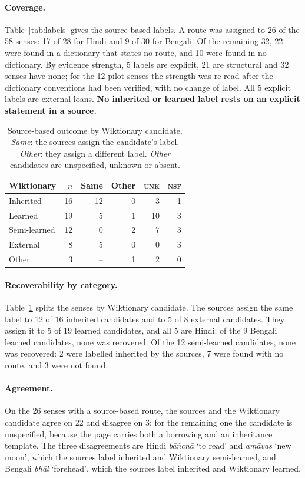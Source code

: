 \documentclass[11pt]{article}
\newcommand{\lbl}[1]{\textsc{#1}}
\newcommand{\gl}[1]{`#1'}
\begin{document}
\paragraph{Coverage.} Table~\ref{tab:labels} gives the source-based labels. A route was assigned to 26 of the 58 senses: 17 of 28 for Hindi and 9 of 30 for Bengali. Of the remaining 32, 22 were found in a dictionary that states no route, and 10 were found in no dictionary. By evidence strength, 5 labels are explicit, 21 are structural and 32 senses have none; for the 12 pilot senses the strength was re-read after the dictionary conventions had been verified, with no change of label. All 5 explicit labels are external loans. \textbf{No inherited or learned label rests on an explicit statement in a source.}

\begin{table}[h]
\centering\small
\begin{tabular}{lrrrrr}
\toprule
\textbf{Wiktionary} & \textbf{$n$} & \textbf{Same} & \textbf{Other} & \textbf{\lbl{unk}} & \textbf{\lbl{nsf}} \\
\midrule
Inherited & 16 & 12 & 0 & 3 & 1 \\
Learned & 19 & 5 & 1 & 10 & 3 \\
Semi-learned & 12 & 0 & 2 & 7 & 3 \\
External & 8 & 5 & 0 & 0 & 3 \\
Other & 3 & -- & 1 & 2 & 0 \\
\bottomrule
\end{tabular}
\caption{Source-based outcome by Wiktionary candidate. \textit{Same}: the sources assign the candidate's label. \textit{Other}: they assign a different label. \textit{Other} candidates are unspecified, unknown or absent.}
\label{tab:recover}
\end{table}

\paragraph{Recoverability by category.} Table~\ref{tab:recover} splits the senses by Wiktionary candidate. The sources assign the same label to 12 of 16 inherited candidates and to 5 of 8 external candidates. They assign it to 5 of 19 learned candidates, and all 5 are Hindi; of the 9 Bengali learned candidates, none was recovered. Of the 12 semi-learned candidates, none was recovered: 2 were labelled inherited by the sources, 7 were found with no route, and 3 were not found.

\paragraph{Agreement.} On the 26 senses with a source-based route, the sources and the Wiktionary candidate agree on 22 and disagree on 3; for the remaining one the candidate is unspecified, because the page carries both a borrowing and an inheritance template. The three disagreements are Hindi \textit{b\=a\~ncn\=a} \gl{to read} and \textit{am\=avas} \gl{new moon}, which the sources label inherited and Wiktionary semi-learned, and Bengali \textit{bh\=al} \gl{forehead}, which the sources label inherited and Wiktionary learned.
\end{document}
